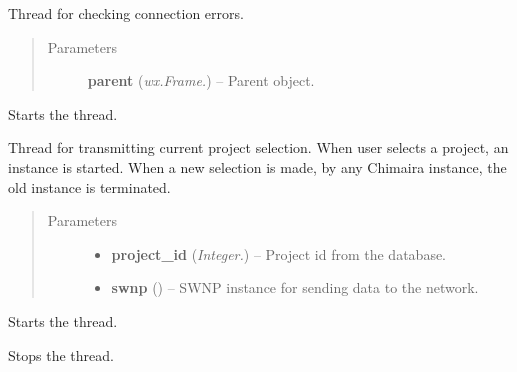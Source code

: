 \documentclass[letterpaper,10pt,english]{sphinxmanual}
\begin{document}
\begin{fulllineitems}
\label{api:wos.CONN_ERR_TH}
Thread for checking connection errors.
\begin{quote}\begin{description}
\item[{Parameters}] \leavevmode
\textbf{parent} (\emph{wx.Frame.}) -- Parent object.

\end{description}\end{quote}

\begin{fulllineitems}
\label{api:wos.CONN_ERR_TH.run}
Starts the thread.

\end{fulllineitems}


\end{fulllineitems}


\begin{fulllineitems}
\label{api:wos.CURRENT_PROJECT}
Thread for transmitting current project selection. When user selects a project, an instance is started. When a new selection is made, by any Chimaira instance, the old instance is terminated.
\begin{quote}\begin{description}
\item[{Parameters}] \leavevmode\begin{itemize}
\item {} 
\textbf{project\_id} (\emph{Integer.}) -- Project id from the database.

\item {} 
\textbf{swnp} ({\hyperref[api:swnp.SWNP]{}}) -- SWNP instance for sending data to the network.

\end{itemize}

\end{description}\end{quote}

\begin{fulllineitems}
\label{api:wos.CURRENT_PROJECT.run}
Starts the thread.

\end{fulllineitems}


\begin{fulllineitems}
\label{api:wos.CURRENT_PROJECT.stop}
Stops the thread.

\end{fulllineitems}


\end{fulllineitems}
\end{document}
